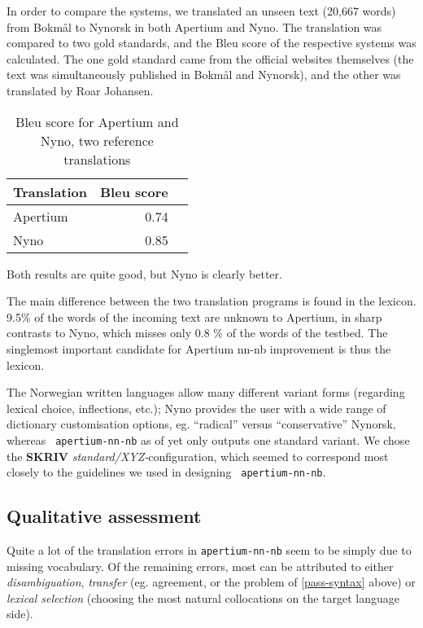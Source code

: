 \documentclass[11pt]{article}
\newcommand{\comment}[1]{\textbf{SKRIV} {\it #1}}
\begin{document}
In order to compare the systems, we translated an unseen text (20,667
words) from Bokmål to Nynorsk in both Apertium and Nyno. The
translation was compared to two gold standards, and
the {\sc Bleu} score \citep{papineni2001bleu} of the respective
systems was calculated. The one gold standard came from the official 
websites themselves (the text was simultaneously published in Bokmål and Nynorsk),
and the other was translated by Roar Johansen.


\begin{table}[htdp]
\caption{Bleu score for Apertium and Nyno, two reference translations}
\begin{center}
\begin{tabular}{|l|r|r|}
\hline
Translation & Bleu score \\
\hline
Apertium    & 0.74 \\
Nyno        & 0.85 \\
\hline
\end{tabular}
\end{center}
\label{bleu}
\end{table}%

Both results are quite good, but Nyno is clearly better.

The main difference between the two translation programs is found in the lexicon.
9.5\% of the words of the incoming text are unknown to Apertium, in sharp
contrasts to Nyno, which misses only 0.8 \% of the words of the testbed.
The singlemost important candidate for Apertium nn-nb improvement is thus the lexicon.



The Norwegian written languages allow many
different variant forms (regarding lexical choice, inflections, etc.);
Nyno provides the user with a wide range of dictionary customisation
options, eg. ``radical'' versus ``conservative'' Nynorsk, whereas {\tt
  apertium-nn-nb} as of yet only outputs one standard variant. We
chose the \comment{standard/XYZ-}configuration, which seemed to
correspond most closely to the guidelines we used in designing {\tt
  apertium-nn-nb}.


\subsection{Qualitative assessment}
Quite a lot of the translation errors in {\tt apertium-nn-nb} seem to be
simply due to missing vocabulary. Of the remaining errors, most can be
attributed to either \emph{disambiguation}, \emph{transfer} (eg.
agreement, or the problem of \ref{pass-syntax} above) or \emph{lexical
  selection} (choosing the most natural collocations on the target
language side).
\end{document}
